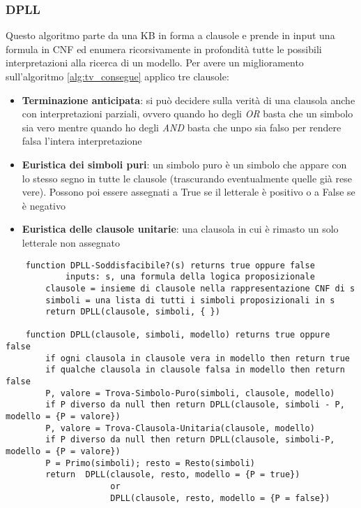 \subsubsection{DPLL}
Questo algoritmo parte da una KB in forma a clausole e prende in input una formula in CNF ed enumera ricorsivamente in profondità tutte le possibili interpretazioni alla ricerca di un modello. Per avere un miglioramento sull'algoritmo \ref{alg:tv_consegue} applico tre clausole:
\begin{itemize}
	\item \textbf{Terminazione anticipata}: si può decidere sulla verità di una clausola anche con interpretazioni parziali, ovvero quando ho degli \textit{OR} basta che un simbolo sia vero mentre quando ho degli \textit{AND} basta che unpo sia falso per rendere falsa l'intera interpretazione
	\item \textbf{Euristica dei simboli puri}: un simbolo puro è un simbolo che appare con lo stesso segno in tutte le clausole (trascurando eventualmente quelle già rese vere). Possono poi essere assegnati a True se il letterale è positivo o a False se è negativo
	\item \textbf{Euristica delle clausole unitarie}: una clausola in cui è rimasto un solo letterale non assegnato
\end{itemize}

\begin{lstlisting}
	function DPLL-Soddisfacibile?(s) returns true oppure false
			inputs: s, una formula della logica proposizionale
		clausole = insieme di clausole nella rappresentazione CNF di s
		simboli = una lista di tutti i simboli proposizionali in s
		return DPLL(clausole, simboli, { })
	
	function DPLL(clausole, simboli, modello) returns true oppure false
		if ogni clausola in clausole vera in modello then return true
		if qualche clausola in clausole falsa in modello then return false
		P, valore = Trova-Simbolo-Puro(simboli, clausole, modello)
		if P diverso da null then return DPLL(clausole, simboli - P, modello = {P = valore})
		P, valore = Trova-Clausola-Unitaria(clausole, modello)
		if P diverso da null then return DPLL(clausole, simboli-P, modello = {P = valore})
		P = Primo(simboli); resto = Resto(simboli)
		return	DPLL(clausole, resto, modello = {P = true})
					 or
					 DPLL(clausole, resto, modello = {P = false})
\end{lstlisting}

